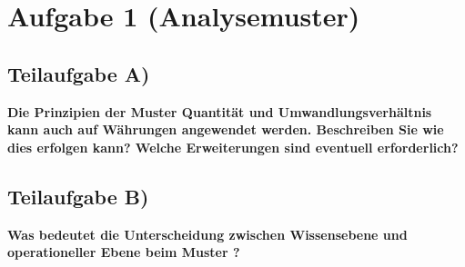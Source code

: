 \section{Aufgabe 1 (Analysemuster)}

\subsection{Teilaufgabe A)}
\textbf{Die Prinzipien der Muster Quantität und Umwandlungsverhältnis kann auch auf
Währungen angewendet werden. Beschreiben Sie wie dies erfolgen kann? Welche
Erweiterungen sind eventuell erforderlich?}

\subsection{Teilaufgabe B)}
\textbf{Was bedeutet die Unterscheidung zwischen Wissensebene und operationeller Ebene
beim Muster ?}


\clearpage
